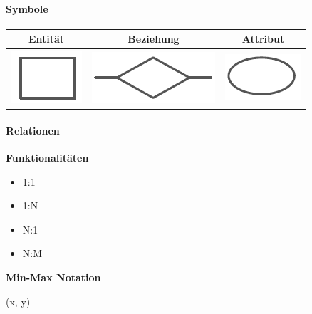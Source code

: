 \documentclass[12pt,a4paper]{article}
\begin{document}
\paragraph{Symbole}
\begin{table}[ht!]
\begin{tabular}{|c|c|c|}
\hline
Entität & Beziehung & Attribut\\
\hline
\includegraphics[scale=0.5]{./resources/enty.png} &
\includegraphics[scale=0.5]{./resources/rel.png} &
\includegraphics[scale=0.5]{./resources/attr.png} \\
\hline
\end{tabular}
\end{table}
\paragraph{Relationen}
\textbf{Funktionalitäten}
\begin{itemize}
\item 1:1
\item 1:N
\item N:1
\item N:M
\end{itemize}
\textbf{Min-Max Notation}
\begin{itemize}
(x, y)
\end{itemize}
\end{document}
